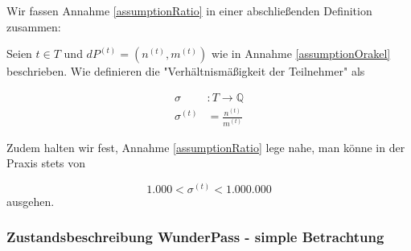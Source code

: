 \vspace{0.3cm}

Wir fassen Annahme \ref{assumptionRatio} in einer abschließenden Definition zusammen:

\vspace{0.3cm}

\begin{Def}\label{defRatio}

Seien $t \in T$ und $dP^{(t)} = \left(n^{(t)}, m^{(t)}\right)$ wie in Annahme \ref{assumptionOrakel} beschrieben. Wie definieren die "Verhältnismäßigkeit der Teilnehmer" als

\begin{align*}
\sigma &: T \rightarrow \mathbb{Q} \\
\sigma^{(t)} &= \frac{n^{(t)}}{m^{(t)}}
\end{align*}

\vspace{0.3cm}

Zudem halten wir fest, Annahme \ref{assumptionRatio} lege nahe, man könne in der Praxis stets von

\begin{equation*}
1.000 < \sigma^{(t)} < 1.000.000
\end{equation*}
ausgehen.

\end{Def}


\vspace{0.6cm}



\subsubsection{Zustandsbeschreibung WunderPass - simple Betrachtung}
\label{sec:eco_zahlen_zustand_wp}







